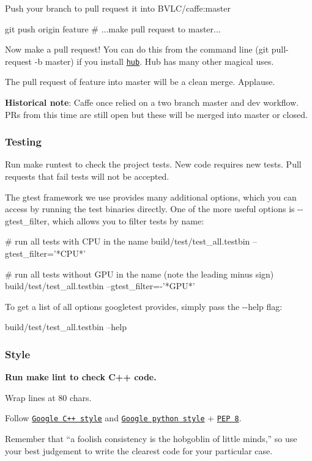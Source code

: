 Push your branch to pull request it into {\ttfamily B\+V\+L\+C/caffe\+:master} \begin{DoxyVerb}git push origin feature
# ...make pull request to master...
\end{DoxyVerb}


Now make a pull request! You can do this from the command line ({\ttfamily git pull-\/request -\/b master}) if you install \href{https://github.com/github/hub}{\tt hub}. Hub has many other magical uses.

The pull request of {\ttfamily feature} into {\ttfamily master} will be a clean merge. Applause.

{\bfseries Historical note}\+: Caffe once relied on a two branch {\ttfamily master} and {\ttfamily dev} workflow. P\+Rs from this time are still open but these will be merged into {\ttfamily master} or closed.

\subsubsection*{Testing}

Run {\ttfamily make runtest} to check the project tests. New code requires new tests. Pull requests that fail tests will not be accepted.

The {\ttfamily gtest} framework we use provides many additional options, which you can access by running the test binaries directly. One of the more useful options is {\ttfamily -\/-\/gtest\+\_\+filter}, which allows you to filter tests by name\+: \begin{DoxyVerb}# run all tests with CPU in the name
build/test/test_all.testbin --gtest_filter='*CPU*'

# run all tests without GPU in the name (note the leading minus sign)
build/test/test_all.testbin --gtest_filter=-'*GPU*'
\end{DoxyVerb}


To get a list of all options {\ttfamily googletest} provides, simply pass the {\ttfamily -\/-\/help} flag\+: \begin{DoxyVerb}build/test/test_all.testbin --help
\end{DoxyVerb}


\subsubsection*{Style}


\begin{DoxyItemize}
\item {\bfseries Run {\ttfamily make lint} to check C++ code.}
\item Wrap lines at 80 chars.
\item Follow \href{https://google.github.io/styleguide/cppguide.html}{\tt Google C++ style} and \href{https://google.github.io/styleguide/pyguide.html}{\tt Google python style} + \href{http://legacy.python.org/dev/peps/pep-0008/}{\tt P\+EP 8}.
\item Remember that “a foolish consistency is the hobgoblin of little minds,” so use your best judgement to write the clearest code for your particular case. 
\end{DoxyItemize}